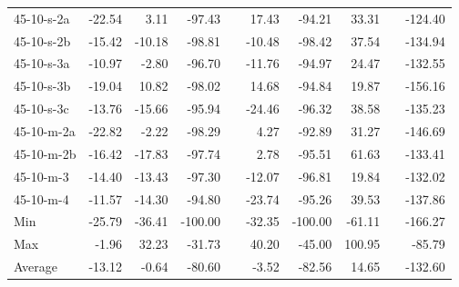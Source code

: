 \begin{table}[h]
\begin{tabular}{lrrrrrrrrr}
    45-10-s-2a & -22.54 & 3.11 & -97.43 && 17.43 & -94.21 & 33.31 && -124.40 \\
    45-10-s-2b & -15.42 & -10.18 & -98.81 && -10.48 & -98.42 & 37.54 && -134.94 \\
    45-10-s-3a & -10.97 & -2.80 & -96.70 && -11.76 & -94.97 & 24.47 && -132.55 \\
    45-10-s-3b & -19.04 & 10.82 & -98.02 && 14.68 & -94.84 & 19.87 && -156.16 \\
    45-10-s-3c & -13.76 & -15.66 & -95.94 && -24.46 & -96.32 & 38.58 && -135.23 \\
    45-10-m-2a & -22.82 & -2.22 & -98.29 && 4.27 & -92.89 & 31.27 && -146.69 \\
    45-10-m-2b & -16.42 & -17.83 & -97.74 && 2.78 & -95.51 & 61.63 && -133.41 \\
    45-10-m-3 & -14.40 & -13.43 & -97.30 && -12.07 & -96.81 & 19.84 && -132.02 \\
    45-10-m-4 & -11.57 & -14.30 & -94.80 && -23.74 & -95.26 & 39.53 && -137.86 \\
    \midrule
    Min & -25.79 & -36.41 & -100.00 && -32.35 & -100.00 & -61.11 && -166.27 \\
    Max & -1.96 & 32.23 & -31.73 && 40.20 & -45.00 & 100.95 && -85.79 \\
    Average & -13.12 & -0.64 & -80.60 && -3.52 & -82.56 & 14.65 && -132.60 \\
    \bottomrule
\end{tabular}
\label{table:comparisonofqualities}
\end{table}

